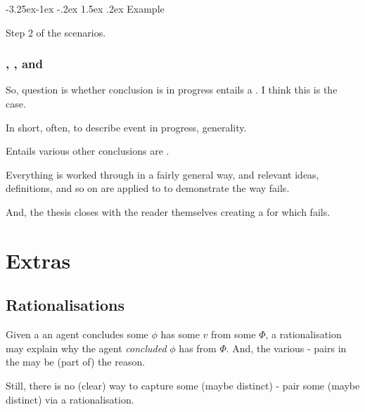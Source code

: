 \documentclass[10pt]{article}
\makeatletter
\renewcommand\paragraph{\@startsection{paragraph}{4}{\z@}%
  {-3.25ex\@plus -1ex \@minus -.2ex}%
  {1.5ex \@plus .2ex}%
  {\normalfont\normalsize\bfseries}}
\makeatother
\begin{document}
\paragraph{Example}

\begin{note}
  Step 2 of the scenarios.
\end{note}

\subsubsection{, , and }
\label{sec:progex-fingfr1}

\begin{note}
  So, question is whether \eiw{} conclusion is in progress entails a \fingfr{}.
  I think this is the case.

  In short, often, to describe event in progress, generality.

  Entails various other conclusions are .
\end{note}

\begin{note}
  Everything is worked through in a fairly general way, and relevant ideas, definitions, and so on are applied to  to demonstrate the way \issueInclusion{} fails.

  And, the thesis closes with the reader themselves creating a  for which \issueInclusion{} fails.
\end{note}

\newpage

\section{Extras}

\subsection*{Rationalisations}
\label{sec:rationalisations}

\begin{note}
  

  \noindent%
\end{note}

\begin{note}
  Given a \eiw{} an agent concludes some  \(\phi\) has some  \(v\) from some \pool{} \(\Phi\), a rationalisation may explain why the agent \emph{concluded} \(\phi\) has  from \(\Phi\).
  And, the various - pairs in the \pool{} may be (part of) the \agents{} reason.

  Still, there is no (clear) way to capture some (maybe distinct) - pair \fof{} some (maybe distinct) \pool{} via a rationalisation.
\end{note}
\end{document}
